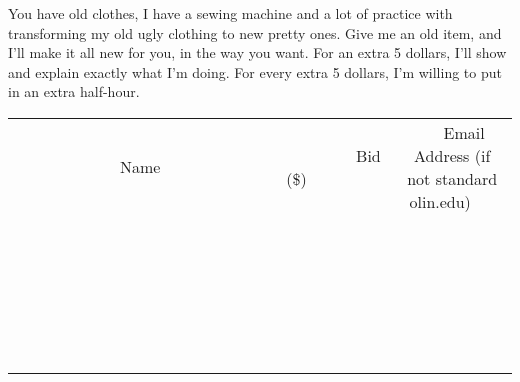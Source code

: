 \documentclass[11pt]{article}
\begin{document}
You have old clothes, I have a sewing machine and a lot of practice with transforming my old ugly clothing to new pretty ones. Give me an old item, and I'll make it all new for you, in the way you want. For an extra 5 dollars, I'll show and explain exactly what I'm doing. For every extra 5 dollars, I'm willing to put in an extra half-hour.
\\[6ex]
\begin{tabular}{c c c}
~~~~~~~~~~~~~Name~~~~~~~~~~~~~ & ~~~~~~~~~Bid (\$)~~~~~~~~~  & ~~~Email Address (if not standard olin.edu)~~~\\
 & & \\
\hline
 & & \\
\hline
 & & \\
\hline
 & & \\
\hline
 & & \\
\hline
 & & \\
\hline
 & & \\
\hline
 & & \\
\hline
 & & \\
\hline
 & & \\
\hline
 & & \\
\hline
 & & \\
\hline
 & & \\
\hline
 & & \\
\hline
 & & \\
\hline
 & & \\
\hline
 & & \\
\hline
 & & \\
\hline
 & & \\
\hline
 & & \\
\hline
 & & \\
\hline
 & & \\
\hline
 & & \\
\hline
 & & \\
\hline
 & & \\
\hline
 & & \\
\hline
\end{tabular}
\newpage
\end{document}
